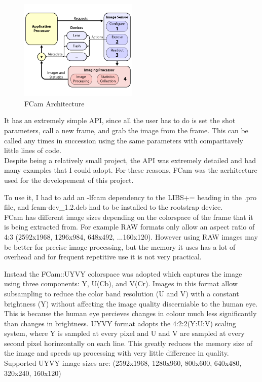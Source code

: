 \begin{figure}
	\vspace{-40pt}
	\begin{center}
		\includegraphics[width=0.5\textwidth]{../images/fcam_arch}
	\end{center}
	\vspace{-20pt}
	\caption{FCam Architecture}
\end{figure}
It has an extremely simple API, since all the user has to do is set the shot parameters, call a new frame, and grab the image from the frame. This can be called any times in succession using the same parameters with comparitavely little lines of code.\\
Despite being a relatively small project, the API was extremely detailed and had many examples that I could adopt. For these reasons, FCam was the acrhitecture used for the developement of this project.

To use it, I had to add an -lfcam dependency to the LIBS+= heading in the .pro file, and fcam-dev\_1.2.deb had to be installed to the rootstrap device.\\

FCam has different image sizes depending on the colorspace of the frame that it is being extracted from. For example RAW formats only allow an aspect ratio of 4:3 (2592x1968, 1296x984, 648x492, ...160x120). However using RAW images may be better for precise image processing, but the memory it uses has a lot of overhead and for frequent repetitive use it is not very practical.

Instead the FCam::UYVY colorspace was adopted which captures the image using three components: Y, U(Cb), and V(Cr). 
Images in this format allow subsampling to reduce the color band resolution (U and V) with a constant brightness (Y) without affecting the image quality discerniable to the human eye. This is because the human eye percieves changes in colour much less significantly than changes in brightness. UYVY format adopts the 4:2:2(Y:U:V) scaling system, where Y is sampled at every pixel and U and V are sampled at every second pixel horinzontally on each line. This greatly reduces the memory size of the image and speeds up processing with very little difference in quality.\\
Supported UYVY image sizes are: (2592x1968, 1280x960, 800x600, 640x480, 320x240, 160x120)

